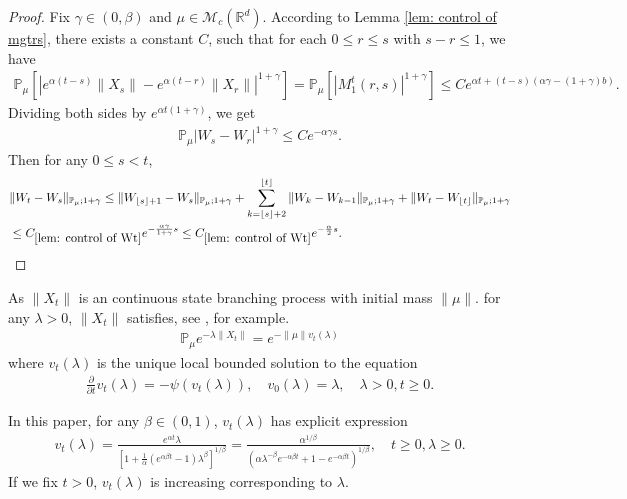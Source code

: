 \documentclass[12pt,oneside,english]{amsart}
\theoremstyle{plain}
\theoremstyle{definition}
\numberwithin{equation}{section}
\begin{document}
\begin{proof}
    Fix $\gamma \in (0,\beta)$ and $\mu\in \mathcal M_c(\mathbb R^d)$.
    According to Lemma \ref{lem: control of mgtrs}, there exists a constant $C$, such that for each $0\leq r\leq s $ with $s-r\leq1$, we have
    \begin{align}
        \mathbb{P}_{\mu}[|e^{\alpha(t-s)}\|X_s\|-e^{\alpha(t-r)}\|X_r\||^{1+\gamma}]=\mathbb{P}_{\mu}[|M_1^t(r,s)|^{1+\gamma}]\leq Ce^{\alpha t+(t-s)(\alpha\gamma-(1+\gamma)b)}.
    \end{align}
    Dividing both sides by $e^{\alpha t(1+\gamma)}$, we get
    \begin{align}
        \mathbb{P}_{\mu}\left|W_s-W_r\right|^{1+\gamma}\leq  C e^{-\alpha \gamma s}.
    \end{align}
    Then for any $0\leq s<t$,
    \begin{align}
       & \|W_t-W_s\|_{\mathbb{P}_{\mu};1+\gamma}\leq \|W_{\lfloor s \rfloor +1}-W_s\|_{\mathbb{P}_{\mu};1+\gamma}+\sum_{k=\lfloor s \rfloor+2}^{\lfloor t \rfloor}\|W_k-W_{k-1}\|_{\mathbb{P}_{\mu};1+\gamma}+\|W_t-W_{\lfloor t \rfloor}\|_{\mathbb{P}_{\mu};1+\gamma}
       \\&\leq C_{\ref{lem: control of Wt}}e^{-\frac{\alpha \gamma}{1+\gamma}s}\leq C_{\ref{lem: control of Wt}}e^{-\frac{\alpha}{2}s}.
    \end{align}
\end{proof}
As $\|X_t\|$ is an continuous state branching process with initial mass $\|\mu\|$.
for any $\lambda>0$, $\|X_t\|$ satisfies, see \cite[Chapter 3]{Li2011Measure-valued}, for example.
\begin{align}\label{CSBP}
    \mathbb{P}_{\mu}e^{-\lambda\|X_t\|}=e^{-\|\mu\|v_t(\lambda)}
\end{align}
where $v_t(\lambda)$ is the unique local bounded solution to the equation
\begin{align*}
    \frac{\partial}{\partial t}v_t(\lambda)=-\psi(v_t(\lambda)), \quad  v_0(\lambda)=\lambda,  \quad \lambda>0, t\geq 0.
\end{align*}

In this paper, for any $\beta\in (0,1)$, $v_t(\lambda)$ has explicit expression \cite[Example 3.1]{Li2011Measure-valued}
\begin{align*}
    v_t(\lambda)=\frac{e^{\alpha t} \lambda}{[1+\frac{1}{\alpha}(e^{\alpha \beta t}-1)\lambda^{\beta}]^{1/\beta}}=\frac{\alpha^{1/\beta}}{(\alpha\lambda^{-\beta}e^{-\alpha \beta t}+1-e^{-\alpha \beta t})^{1/\beta}},\quad t\geq 0,\lambda\geq 0.
\end{align*}
If we fix $t>0$, $v_t(\lambda)$ is increasing corresponding to $\lambda$.
\end{document}
